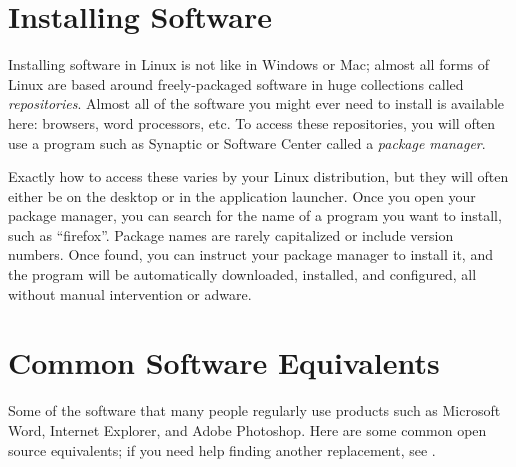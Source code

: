 \documentclass[11pt,notumble]{leaflet}
\begin{document}
\pagebreak

\section{Installing Software}
\label{section:installing-software}

Installing software in Linux is not like in Windows or Mac; almost all forms of
Linux are based around freely-packaged software in huge collections called
\emph{repositories}. Almost all of the software you might ever need to install
is available here: browsers, word processors, etc. To access these repositories,
you will often use a program such as Synaptic or Software Center called a
\emph{package manager}.

Exactly how to access these varies by your Linux distribution, but they will
often either be on the desktop or in the application launcher. Once you open
your package manager, you can search for the name of a program you want to
install, such as ``firefox''. Package names are rarely capitalized or include
version numbers. Once found, you can instruct your package manager to install
it, and the program will be automatically downloaded, installed, and configured,
all without manual intervention or adware.


\section{Common Software Equivalents}
\label{section:common-software-equivalents}

Some of the software that many people regularly use products such as Microsoft
Word, Internet Explorer, and Adobe Photoshop.  Here are some common open source
equivalents; if you need help finding another replacement, see
.

\end{document}
